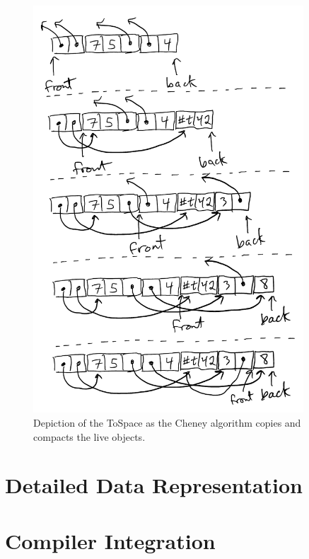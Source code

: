 \documentclass[11pt]{book}
\begin{document}
\begin{figure}[tbp]
\centering \includegraphics[width=0.9\textwidth]{cheney}
\caption{Depiction of the ToSpace as the Cheney algorithm copies and
  compacts the live objects.}
\label{fig:cheney}
\end{figure}


\section{Detailed Data Representation}
\label{sec:data-rep-gc}


\section{Compiler Integration}
\label{sec:compiler-integration}



\end{document}
